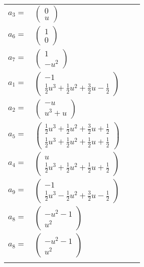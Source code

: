 \documentclass[1p]{elsarticle_modified}
\theoremstyle{definition}
\begin{document}
\begin{tabular}{m{7pt} m{180pt} m{7pt} m{180pt} }
\flushright $a_{3}=$&$\begin{pmatrix}0\\u\end{pmatrix}$ \\
\flushright $a_{6}=$&$\begin{pmatrix}1\\0\end{pmatrix}$ \\
\flushright $a_{7}=$&$\begin{pmatrix}1\\- u^2\end{pmatrix}$ \\
\flushright $a_{1}=$&$\begin{pmatrix}-1\\\frac{1}{2} u^3+\frac{1}{2} u^2+\frac{3}{2} u-\frac{1}{2}\end{pmatrix}$ \\
\flushright $a_{2}=$&$\begin{pmatrix}- u\\u^3+u\end{pmatrix}$ \\
\flushright $a_{5}=$&$\begin{pmatrix}\frac{1}{2} u^3+\frac{1}{2} u^2+\frac{3}{2} u+\frac{1}{2}\\\frac{1}{2} u^3+\frac{1}{2} u^2+\frac{1}{2} u+\frac{1}{2}\end{pmatrix}$ \\
\flushright $a_{4}=$&$\begin{pmatrix}u\\\frac{1}{2} u^3+\frac{1}{2} u^2+\frac{1}{2} u+\frac{1}{2}\end{pmatrix}$ \\
\flushright $a_{9}=$&$\begin{pmatrix}-1\\\frac{1}{2} u^3-\frac{1}{2} u^2+\frac{3}{2} u-\frac{1}{2}\end{pmatrix}$ \\
\flushright $a_{8}=$&$\begin{pmatrix}- u^2-1\\u^2\end{pmatrix}$\\ \flushright $a_{8}=$&$\begin{pmatrix}- u^2-1\\u^2\end{pmatrix}$\\&\end{tabular}
\end{document}
